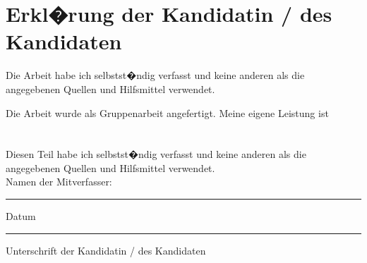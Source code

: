 \chapter{Erkl�rung der Kandidatin / des Kandidaten}

\begin{description}[$\Box$~]
\item[$\Box$] Die Arbeit habe ich selbstst�ndig verfasst und keine anderen als die angegebenen Quellen und Hilfsmittel verwendet.\\

\item[$\Box$] Die Arbeit wurde als Gruppenarbeit angefertigt. Meine eigene Leistung ist\\
\\
\\

Diesen Teil habe ich selbstst�ndig verfasst und keine anderen als die angegebenen Quellen und Hilfsmittel verwendet. \\

Namen der Mitverfasser: 

\end{description}

\vspace{2cm}

\begin{minipage}[t]{3cm}
\rule{3cm}{0.5pt}
Datum
\end{minipage}
\hfill
\begin{minipage}[t]{9cm}
\rule{9cm}{0.5pt}
Unterschrift der Kandidatin / des Kandidaten
\end{minipage}